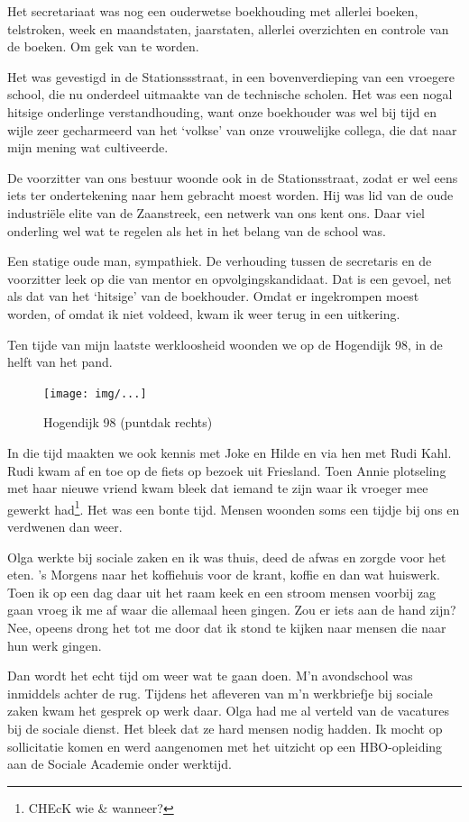 \documentclass[12pt,twoside]{memoir}
\begin{document}
Het secretariaat was nog een ouderwetse boekhouding met allerlei boeken, telstroken, week en maandstaten, jaarstaten, allerlei overzichten en controle van de boeken. Om gek van te worden. 

Het was gevestigd in de Stationssstraat, in een bovenverdieping van een vroegere school, die nu onderdeel uitmaakte van de technische scholen. Het was een nogal hitsige onderlinge verstandhouding, want onze boekhouder was wel bij tijd en wijle zeer gecharmeerd van het `volkse' van onze vrouwelijke collega, die dat naar mijn mening wat cultiveerde. 

De voorzitter van ons bestuur woonde ook in de Stationsstraat, zodat er wel eens iets ter ondertekening naar hem gebracht moest worden. Hij was lid van de oude industriële elite van de Zaanstreek, een netwerk van ons kent ons. Daar viel onderling wel wat te regelen als het in het belang van de school was. 

Een statige oude man, sympathiek. De verhouding tussen de secretaris en de voorzitter leek op die van mentor en opvolgingskandidaat. Dat is een gevoel, net als dat van het `hitsige' van de boekhouder. Omdat er ingekrompen moest worden, of omdat ik niet voldeed, kwam ik weer terug in een uitkering.

Ten tijde van mijn laatste werkloosheid woonden we op de Hogendijk 98, in de helft van het pand.

\begin{figure}[t]
\texttt{[image: img/...]}
\caption{Hogendijk 98 (puntdak rechts)}
\end{figure}

In die tijd maakten we ook kennis met Joke en Hilde en via hen met Rudi Kahl. Rudi kwam af en toe op de fiets op bezoek uit Friesland. Toen Annie plotseling met haar nieuwe vriend kwam bleek dat iemand te zijn waar ik vroeger mee gewerkt had\footnote{CHEcK wie & wanneer?}. Het was een bonte tijd. Mensen woonden soms een tijdje bij ons en verdwenen dan weer. 

Olga werkte bij sociale zaken en ik was thuis, deed de afwas en zorgde voor het eten. 's Morgens naar het koffiehuis voor de krant, koffie en dan wat huiswerk. Toen ik op een dag daar uit het raam keek en een stroom mensen voorbij zag gaan vroeg ik  me af waar die allemaal heen gingen. Zou er iets aan de hand zijn? Nee, opeens drong het tot me door dat ik stond te kijken naar mensen die naar hun werk gingen. 

Dan wordt het echt tijd om weer wat te gaan doen. M'n avondschool was inmiddels achter de rug. Tijdens het afleveren van m'n werkbriefje bij sociale zaken kwam het gesprek op werk daar. Olga had me al verteld van de vacatures bij de sociale dienst. Het bleek dat ze hard mensen nodig hadden. Ik mocht op sollicitatie komen en werd aangenomen met het uitzicht op een HBO-opleiding aan de Sociale Academie onder werktijd. 
\end{document}
